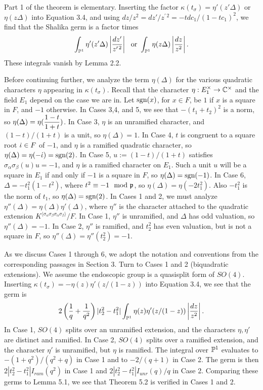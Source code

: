 Part 1 of the theorem is elementary.
Inserting the factor $\kappa(t_\sigma) = \eta'(z'\Delta)$ or
$\eta(z\Delta)$
into
Equation 3.4, and using $dz/z^2= dz'/z^{\prime\,2}
 = -t dc_1/(1 - t c_1)^2$, we find
that the Shalika germ is a factor times
$$ \int_{\P^1} \eta'(z' \Delta) \left|
{ dz'\over z^{\prime\,2}}\right | \ \hbox{ or }
\int_{\P^1} \eta(z \Delta) \left|
{ dz\over z^2}\right |.$$
These integrals vanish by Lemma 2.2.

Before continuing further, we analyze the term $\eta(\Delta)$
for the various quadratic characters $\eta$ appearing in
$\kappa(t_\sigma)$.  Recall that the character 
$\eta:E_1^\times\to\C^\times$ and the field $E_1$ 
depend on the case we are in.  Let $\hbox{sgn}(x)$, for
$x\in F$, be $1$ if $x$ is a square in $F$, and $-1$
otherwise.
In Cases 3,4, and 5, we see that $-(t_1+t_2)^2$ is a norm,
so $\eta(\Delta)=\eta(\displaystyle{1-t\over 1+t})$.
In Case 3, $\eta$ is an unramified character, and
$(1-t)/(1+t)$ is a unit, so $\eta(\Delta)=1$.  In Case 4,
$t$ is congruent to a square root $\jota\in F$ of $-1$, and
$\eta$ is a ramified quadratic character, so
$\eta(\Delta)=\eta(-\jota) = \hbox{sgn}(2)$.  In Case 5,
$u:= (1-t)/(1+t)$ satisfies $\sigma_{\alpha}\sigma_\beta(u)u= -1$,
and $\eta$ is a ramified character on $E_1$.  Such a unit 
$u$ will be a square in $E_1$ if and only if $-1$ is a square in $F$,
so $\eta(\Delta) = \hbox{sgn}(-1)$.
In Case 6, $\Delta = -t_1^2 (1-t^2)$,
where $t^2 \equiv -1 \mod\pp$, so $\eta(\Delta) =\eta(-2t_1^2)$.
Also $-t_1^2$ is the norm of $t_1$, so $\eta(\Delta) = \hbox{sgn}(2)$.
In Cases 1 and 2, we must analyze 
$\eta''(\Delta)=\eta(\Delta)\eta'(\Delta) $,
where $\eta''$ is the character attached to the quadratic
extension $K^{\langle\sigma_\alpha\sigma_\beta\sigma_\alpha\sigma_\beta\rangle}/F$.  In Case 1, $\eta''$ is unramified, and $\Delta$ has odd
valuation, so $\eta''(\Delta) = -1$.  In Case 2, $\eta''$ is
ramified, and $t_2^2$ has even valuation, but is not a square
in $F$,
so $\eta''(\Delta) = \eta''(t_2^2) = -1$.

As we discuss Cases 1 through 6, we adopt the notation and
conventions from the corresponding passages in Section 3.
Turn to Cases 1 and 2 (biquadratic extensions).  
We assume the endoscopic group is
a quasisplit form of $SO(4)$.  Inserting $\kappa(t_\sigma)
= -\eta(z)\eta'(z/(1-z))$ into Equation 3.4, we see that
the germ is
$$2\left({1\over q} +{1\over q^2}\right) |t_2^2-t_1^2|
\int_{\P^1} \eta(z)\eta'(z/(1-z)) \left| {dz\over z^2}\right |.$$
In Case 1, $SO(4)$ splits over an unramified extension, and
the characters $\eta,\eta'$ are distinct and ramified.
In Case 2, $SO(4)$ splits over a ramified extension, and
the character $\eta'$ is unramified, but $\eta$ is ramified.
The integral over $\P^1$ evaluates to $-(1+q^2)/(q^2+q)$ in 
Case 1 and to $-2/(q+1)$ in Case 2.  The germ is
then $2|t_2^2-t_1^2|I_{ram}(q^2)$ in Case 1 and
$2|t_2^2-t_1^2|I_{unr}(q)/q$ in Case 2.
Comparing these germs
to Lemma 5.1, we see that Theorem 5.2 is verified
in Cases 1 and 2.

